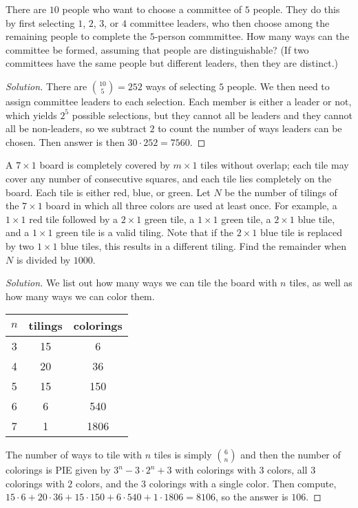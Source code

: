 \begin{prb}[2014 HMMT C-2]
There are $10$ people who want to choose a committee of $5$ people. They do this
by first selecting $1$, $2$, $3$, or $4$ committee leaders, who then choose
among the remaining people to complete the $5$-person commmittee. How many ways
can the committee be formed, assuming that people are distinguishable? (If two
committees have the same people but different leaders, then they are distinct.)
\end{prb}

\ifsolutions
\begin{proof}[Solution]
There are $\binom{10}{5} = 252$ ways of selecting $5$ people. We then need to
assign committee leaders to each selection. Each member is either a leader or
not, which yields $2^5$ possible selections, but they cannot all be leaders and
they cannot all be non-leaders, so we subtract $2$ to count the number of ways
leaders can be chosen. Then answer is then $30 \cdot 252 = \boxed{7560}$.
\end{proof}
\fi

\begin{prb}[2013 AIME II-9]
A $7 \times 1$ board is completely covered by $m \times 1$ tiles without
overlap; each tile may cover any number of consecutive squares, and each tile
lies completely on the board. Each tile is either red, blue, or green. Let $N$
be the number of tilings of the $7 \times 1$ board in which all three colors are
used at least once. For example, a $1 \times 1$ red tile followed by a $2 \times
1$ green tile, a $1 \times 1$ green tile, a $2 \times 1$ blue tile, and a $1
\times 1$ green tile is a valid tiling. Note that if the $2 \times 1$ blue tile
is replaced by two $1 \times 1$ blue tiles, this results in a different tiling.
Find the remainder when $N$ is divided by $1000$.
\end{prb}

\ifsolutions
\begin{proof}[Solution]
We list out how many ways we can tile the board with $n$ tiles, as well as how
many ways we can color them.

\begin{center}
\begin{tabular}{c | c | c}
$n$ & tilings & colorings \\ \hline
3 & 15 & 6 \\
4 & 20 & 36 \\
5 & 15 & 150 \\
6 & 6 & 540 \\
7 & 1 & 1806 \\
\end{tabular}
\end{center}

The number of ways to tile with $n$ tiles is simply $\binom{6}{n}$ and then the
number of colorings is PIE given by $3^n - 3 \cdot 2^n + 3$ with colorings with
$3$ colors, all $3$ colorings with $2$ colors, and the $3$ colorings with a
single color. Then compute, $15 \cdot 6 + 20 \cdot 36 + 15 \cdot 150 + 6 \cdot
540 + 1 \cdot 1806 = 8106$, so the answer is $\boxed{106}$.
\end{proof}
\fi

